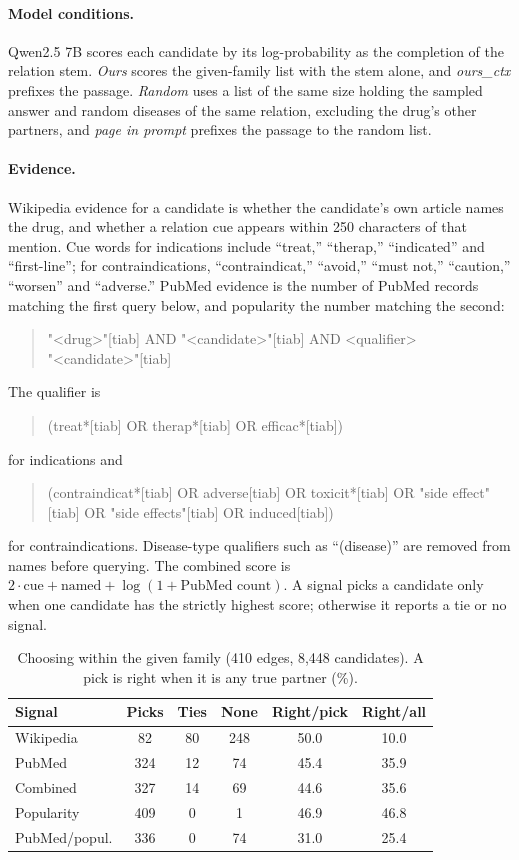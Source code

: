 \documentclass[letterpaper]{article} %
\begin{document}
\paragraph{Model conditions.}
Qwen2.5 7B scores each candidate by its log-probability as the completion of
the relation stem. \emph{Ours} scores the given-family list with the stem
alone, and \emph{ours\_ctx} prefixes the passage. \emph{Random} uses a list of
the same size holding the sampled answer and random diseases of the same
relation, excluding the drug's other partners, and \emph{page in prompt}
prefixes the passage to the random list.

\paragraph{Evidence.}
Wikipedia evidence for a candidate is whether the candidate's own article names
the drug, and whether a relation cue appears within 250 characters of that
mention. Cue words for indications include ``treat,'' ``therap,''
``indicated'' and ``first-line''; for contraindications, ``contraindicat,''
``avoid,'' ``must not,'' ``caution,'' ``worsen'' and ``adverse.'' PubMed
evidence is the number of PubMed records matching the first query below, and
popularity the number matching the second:
\begin{quote}
\footnotesize\ttfamily
"<drug>"[tiab] AND "<candidate>"[tiab] AND <qualifier>\\
"<candidate>"[tiab]
\end{quote}
The qualifier is
\begin{quote}
\footnotesize\ttfamily
(treat*[tiab] OR therap*[tiab] OR efficac*[tiab])
\end{quote}
for indications and
\begin{quote}
\footnotesize\ttfamily
(contraindicat*[tiab] OR adverse[tiab] OR toxicit*[tiab] OR "side effect"[tiab] OR "side effects"[tiab] OR induced[tiab])
\end{quote}
for contraindications. Disease-type qualifiers such as
``(disease)'' are removed from names before querying. The combined score is
$2 \cdot \text{cue} + \text{named} + \log(1 + \text{PubMed count})$. A signal
picks a candidate only when one candidate has the strictly highest score;
otherwise it reports a tie or no signal.

\begin{table}[h]
\centering
\small
\setlength{\tabcolsep}{3pt}
\begin{tabular}{lccccc}
\toprule
Signal & Picks & Ties & None & Right/pick & Right/all \\
\midrule
Wikipedia & 82 & 80 & 248 & 50.0 & 10.0 \\
PubMed & 324 & 12 & 74 & 45.4 & 35.9 \\
Combined & 327 & 14 & 69 & 44.6 & 35.6 \\
Popularity & 409 & 0 & 1 & 46.9 & 46.8 \\
PubMed/popul. & 336 & 0 & 74 & 31.0 & 25.4 \\
\bottomrule
\end{tabular}
\caption{Choosing within the given family (410 edges, 8,448 candidates). A pick
is right when it is any true partner (\%).}
\label{tab:signals}
\end{table}
\end{document}
